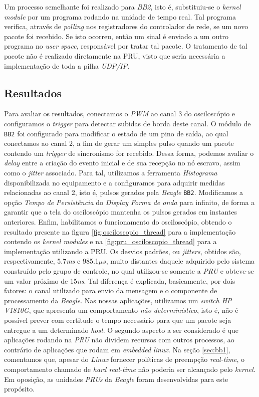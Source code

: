 \vspace{12pt}

Um processo semelhante foi realizado para \textit{BB2}, isto é, substituiu-se o
\textit{kernel module} por um programa rodando na unidade de tempo real. Tal
programa verifica, através de \textit{polling} nos registradores do controlador
de rede, se um novo pacote foi recebido. Se isto ocorreu, então um sinal é
enviado a um outro programa no \textit{user space}, responsável por tratar tal
pacote. O tratamento de tal pacote não é realizado diretamente na PRU, visto que
seria necessária a implementação de toda a pilha \textit{UDP/IP}.

\subsection {Resultados}

Para avaliar os resultados, conectamos o \textit{PWM} ao canal 3 do osciloscópio
e configuramos o \textit{trigger} para detectar subidas de borda deste canal. O
módulo de \texttt{BB2} foi configurado para modificar o estado de um pino de
saída, ao qual conectamos ao canal 2, a fim de gerar um simples pulso quando um
pacote contendo um \textit{trigger} de sincronismo for recebido. Dessa forma,
podemos avaliar o \textit{delay} entre a criação do evento inicial e de sua
recepção no nó escravo, assim como o \textit{jitter} associado. Para tal,
utilizamos a ferramenta \textit{Histograma} disponibilizada no equipamento e a
configuramos para adquirir medidas relacionadas ao canal 2, isto é, pulsos
gerados pela \textit{Beagle} \texttt{BB2}. Modificamos a opção \textit{Tempo de
Persistência} do \textit{Display Forma de onda} para infinito, de forma a
garantir que a tela do osciloscópio mantenha os pulsos gerados em instantes
anteriores. Enfim, habilitamos o funcionamento do osciloscópio, obtendo o
resultado presente na figura \ref{fig:osciloscopio_thread} para a implementação
contendo os \textit{kernel modules} e na \ref{fig:pru_osciloscopio_thread} para
a implementação utilizando a PRU. Os desvios padrões, ou \textit{jitters},
obtidos são, respectivamente, 5.7\textit{ms} e 985.1\(\mu s\), muito distantes
daquele adquirido pelo sistema construído pelo grupo de controle, no qual
utilizou-se somente a \textit{PRU} e obteve-se um valor próximo de
15\textit{ns}. Tal diferença é explicada, basicamente, por dois fatores: o canal
utilizado para envio da mensagem e o componente de processamento da
\textit{Beagle}. Nas nossas aplicações, utilizamos um \textit{switch HP V1810G},
que apresenta um comportamento \textit{não determinístico}, isto é, não é
possível prever com certitude o tempo necessário para que um pacote seja
entregue a um determinado \textit{host}. O segundo aspecto a ser considerado é
que aplicações rodando na \textit{PRU} não dividem recursos com outros
processos, ao contrário de aplicações que rodam em \textit{embedded linux}. Na
seção \ref{sec:bb1}, comentamos que, apesar do \textit{Linux} fornecer políticas
de preempção \textit{real-time}, o comportamento chamado de \textit{hard
real-time} não poderia ser alcançado pelo \textit{kernel}. Em oposição, as
unidades \textit{PRUs} da \textit{Beagle} foram desenvolvidas para este
propósito.

